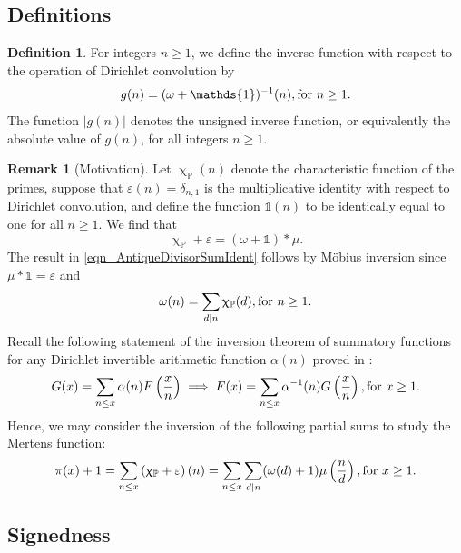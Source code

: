 \documentclass[11pt,reqno,a4letter]{article}
\numberwithin{equation}{section}
\numberwithin{figure}{section}
\numberwithin{table}{section}
\renewcommand{\chi}{\upchi}
\theoremstyle{plain}
\numberwithin{theorem}{section}
\theoremstyle{definition}
\newtheorem{remark}[theorem]{Remark}
\newtheorem{definition}[theorem]{Definition}
\theoremstyle{remark}
\newcommand{\mathtext}[1]{\text{\rm #1}}
\begin{document}
\subsection{Definitions}
\label{subSection_remark_MotivationForTheDefinitionOf_gn_v2}

\begin{definition}
\label{def_gn_and_Absgn_v2} 
For integers $n \geq 1$, we define the inverse function 
with respect to the operation of Dirichlet convolution by 
\[
g(n) = (\omega + \mathds{1})^{-1}(n), \mathtext{ for } n \geq 1. 
\]
The function $|g(n)|$ denotes the unsigned inverse function, 
or equivalently the absolute value of $g(n)$, for all integers $n \geq 1$. 
\end{definition}

\begin{remark}[Motivation]
Let $\chi_{\mathbb{P}}(n)$ denote the characteristic function of the primes, suppose that 
$\varepsilon(n) = \delta_{n,1}$ is the multiplicative identity 
with respect to Dirichlet convolution, and define the 
function $\mathds{1}(n)$ to be identically equal to one for all $n \geq 1$. 
We find that 
\begin{equation}
\label{eqn_AntiqueDivisorSumIdent} 
\chi_{\mathbb{P}} + \varepsilon = (\omega + \mathds{1}) \ast \mu. 
\end{equation} 
The result in \eqref{eqn_AntiqueDivisorSumIdent} follows by M\"obius inversion 
since $\mu \ast \mathds{1} = \varepsilon$ and 
\[
\omega(n) = \sum_{d|n} \chi_{\mathbb{P}}(d), \mathtext{ for } n \geq 1. 
\]
Recall the following statement of the 
inversion theorem of summatory functions for any 
Dirichlet invertible arithmetic function $\alpha(n)$ 
proved in \cite[\S 2.14]{APOSTOLANUMT}:
\begin{equation}
\label{eqn_ApostolStmt_ClassicSummatoryFuncInvThm_v1} 
G(x) = \sum_{n \leq x} \alpha(n) F\left(\frac{x}{n}\right) \implies 
     F(x) = \sum_{n \leq x} \alpha^{-1}(n) G\left(\frac{x}{n}\right), 
     \mathtext{ for } x \geq 1. 
\end{equation}
Hence, we may consider the inversion of the following partial sums to study the Mertens function: 
\[
\pi(x) + 1 = \sum_{n \leq x} \left(\chi_{\mathbb{P}} + \varepsilon\right)(n) = 
     \sum_{n \leq x} \sum_{d|n} (\omega(d) + 1) \mu\left(\frac{n}{d}\right), 
	\mathtext{ for } x \geq 1. 
\]
\end{remark}

\subsection{Signedness}
\label{Section_PrelimProofs_Config} 
\label{subSection_ProofOfSignednessOfgInvn_v1} 
\end{document}
